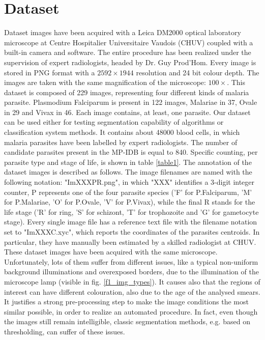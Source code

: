\documentclass[final,a4paper,12pt,english]{UnicaPhdThesis3}
\begin{document}
\section{Dataset}
Dataset images have been acquired with a Leica DM2000 optical laboratory microscope at Centre Hospitalier Universitaire Vaudois (CHUV) coupled with a built-in camera and software. The entire procedure has been realized under the supervision of expert radiologists, headed by Dr. Guy Prod'Hom. Every image is stored in PNG format with a $2592\times1944$ resolution and 24 bit colour depth. The images are taken with the same magnification of the microscope: $100\times$.
This dataset is composed of 229 images, representing four different kinds of malaria parasite. Plasmodium Falciparum is present in 122 images, Malariae in 37, Ovale in 29 and Vivax in 46. Each image contains, at least, one parasite. Our dataset can be used either for testing segmentation capability of algorithms or classification system methods. 
It contains about 48000 blood cells, in which malaria parasites have been labelled by expert radiologists. The number of candidate parasites present in the MP-IDB is equal to 840. Specific counting, per parasite type and stage of life, is shown in table \ref{table1}.
The annotation of the dataset images is described as follows. The image filenames are named with the following notation: "ImXXXPR.png", in which "XXX" identifies a 3-digit integer counter, P represents one of the four parasite species ('F' for P.Falciparum, 'M' for P.Malariae, 'O' for P.Ovale, 'V' for P.Vivax), while the final R stands for the life stage ('R' for ring, 'S' for schizont, 'T' for trophozoite and 'G' for gametocyte stage). Every single image file has a reference text file with the filename notation set to "ImXXXC.xyc", which reports the coordinates of the parasites centroids. In particular, they have manually been estimated by a skilled radiologist at CHUV. 
These dataset images have been acquired with the same microscope. Unfortunately, lots of them suffer from different issues, like a typical non-uniform background illuminations and overexposed borders, due to the illumination of the microscope lamp (visible in fig. \ref{f1_img_types}). It causes also that the regions of interest can have different colouration, also due to the age of the analysed smears. It justifies a strong pre-processing step to make the image conditions the most similar possible, in order to realize an automated procedure. In fact, even though the images still remain intelligible, classic segmentation methods, e.g. based on thresholding, can suffer of these issues.
\end{document}
